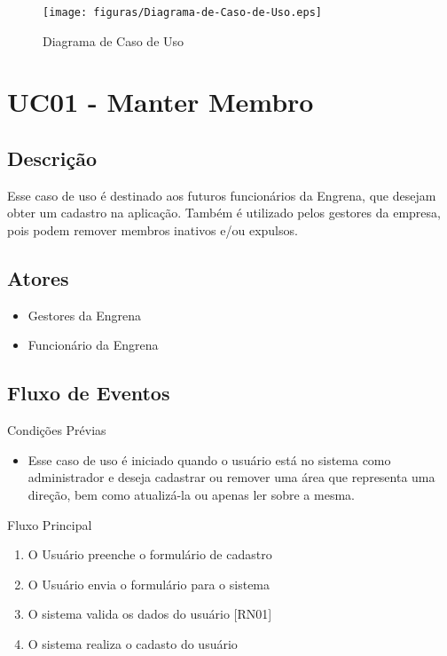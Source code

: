\begin{figure}[htb]
	\centering
	\label{figura_Diagrama-de-Caso-de-Uso}
		\texttt{[image: figuras/Diagrama-de-Caso-de-Uso.eps]}
	\caption{Diagrama de Caso de Uso}
\end{figure}

\clearpage{}


\section{UC01 - Manter Membro}

\subsection{Descrição}

Esse caso de uso é destinado aos futuros funcionários da Engrena, que desejam obter um cadastro na aplicação. Também é utilizado pelos gestores da empresa, pois podem remover membros inativos e/ou expulsos.

\subsection{Atores}

\begin{itemize}
  \item{Gestores da Engrena}
  \item{Funcionário da Engrena}
\end{itemize}

\subsection{Fluxo de Eventos}

Condições Prévias
\begin{itemize}
  \item{Esse caso de uso é iniciado quando o usuário está no sistema como administrador e deseja cadastrar ou remover uma área que representa uma direção, bem como atualizá-la ou apenas ler sobre a mesma.}
\end{itemize}

Fluxo Principal
\begin{enumerate}
  \item{O Usuário preenche o formulário de cadastro} %
  \item{O Usuário envia o formulário para o sistema} %
  \item{O sistema valida os dados do usuário [RN01]} %
  \item{O sistema realiza o cadasto do usuário} %
\end{enumerate}


